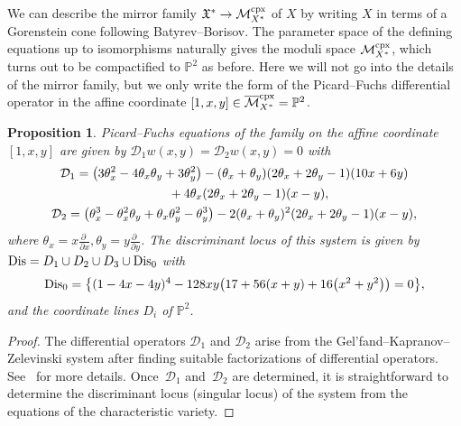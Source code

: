 \documentclass[10pt,a4paper]{amsart}
\numberwithin{equation}{section}
\newtheorem{Proposition}[Theorem]{Proposition}
\begin{document}
We can describe the mirror family $\mathfrak{X}^{*}\to\mathcal{M}_{X^{*}}^{\rm cpx}$ of $X$ by writing $X$ in terms of a Gorenstein cone following Batyrev--Borisov. The parameter space of the defining equations up to isomorphisms naturally gives the moduli space $\mathcal{M}_{X^{*}}^{\rm cpx}$, which turns out to be compactified to $\mathbb{P}^{2}$ as before. Here we will not go into the details of the mirror family, but we only write the form of the Picard--Fuchs differential operator in the affine coordinate $[1,x,y]\in\overline{\mathcal{M}}_{X^{*}}^{\rm cpx}=\mathbb{P}^{2}$.
\begin{Proposition} Picard--Fuchs equations of the family on the affine coordinate $[1,x,y]$ are given by $\mathcal{D}_{1}w(x,y)=\mathcal{D}_{2}w(x,y)=0$ with
\begin{gather*}
\mathcal{D}_{1}= \big(3\theta_{x}^{2}-4\theta_{x}\theta_{y}+3\theta_{y}^{2}\big)-(\theta_{x}+\theta_{y})(2\theta_{x}+2\theta_{y}-1)(10x+6y)\\
\hphantom{\mathcal{D}_{1}=}{} +4\theta_{x}(2\theta_{x}+2\theta_{y}-1)(x-y),\\
\mathcal{D}_{2}= \big(\theta_{x}^{3}-\theta_{x}^{2}\theta_{y}+\theta_{x}\theta_{y}^{2}-\theta_{y}^{3}\big)-2(\theta_{x}+\theta_{y})^{2}(2\theta_{x}+2\theta_{y}-1)(x-y),
\end{gather*}
where $\theta_{x}=x\frac{\partial\;}{\partial x},\theta_{y}=y\frac{\partial\;}{\partial y}$. The discriminant locus of this system is given by ${\rm Dis}=D_{1}\cup D_{2}\cup D_{3}\cup {\rm Dis}_{0}$ with
\begin{gather*}
{\rm Dis}_{0}=\big\{ (1-4x-4y)^{4}-128xy\big(17+56(x+y)+16\big(x^{2}+y^{2}\big)\big)=0\big\} ,%
\end{gather*}
and the coordinate lines $D_{i}$ of $\mathbb{P}^{2}$. \end{Proposition}
\begin{proof}The differential operators $\mathcal{D}_{1}$ and $\mathcal{D}_{2}$ arise from the Gel'fand--Kapranov--Zelevinski system after finding suitable factorizations of differential operators. See~\cite{HKTY} for more details. Once~$\mathcal{D}_{1}$ and~$\mathcal{D}_{2}$ are determined,
it is straightforward to determine the discriminant locus (singular locus) of the system from the equations of the characteristic variety.
\end{proof}
\end{document}
